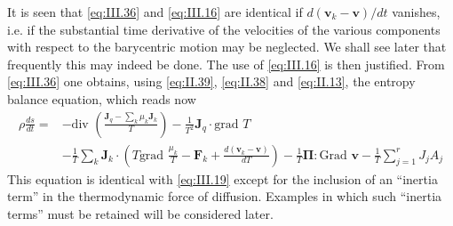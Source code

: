 It is seen that \eqref{eq:III.36} and \eqref{eq:III.16} are identical if $d(\bm{v}_k - \bm{v})/dt$ vanishes, i.e. if the substantial time derivative of the velocities of the various components with respect to the barycentric motion may be neglected. We shall see later that frequently this may indeed be done. The use of \eqref{eq:III.16}
is then justified.
From \eqref{eq:III.36} one obtains, using \eqref{eq:II.39}, \eqref{eq:II.38} and \eqref{eq:II.13}, the entropy balance equation, which reads now
\begin{equation}
\begin{split}
    \rho \frac{ds}{dt} = &- \textrm{div } \left( \frac{\bm{J}_q - \sum_{k} \mu_k \bm{J}_k}{T} \right) 
- 
\frac{1}{T^2} \bm{J}_q \cdot \textrm{grad } T \\
&- 
\frac{1}{T} \sum_{k} \bm{J}_k \cdot \left( T \textrm{grad } \frac{\mu_k}{T} - \bm{F}_k 
+ \frac{d (\bm{v}_k - \bm{v})}{d T}\right)
- 
\frac{1}{T} \bm{\Pi} : \textrm{Grad } \bm{v} - \frac{1}{T} \sum_{j=1}^r J_j A_j
\end{split}
    \label{eq:III.39}
\end{equation}
This equation is identical with \eqref{eq:III.19} except for the inclusion of an ``inertia term'' in the thermodynamic force of diffusion. Examples in which such ``inertia terms'' must be retained will be considered later.

